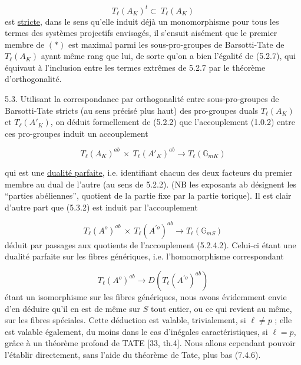 \begin{equation}\tag{*}
T_\ell(A_K)^t \subset \ T_\ell(A_K)
\end{equation}
est \underline{stricte}, dans le sens qu'elle induit déjà un monomorphisme pour tous les termes des systèmes projectifs envisagés, il s'ensuit aisément que le premier membre de $(*)$ est maximal parmi les sous-pro-groupes de Barsotti-Tate de $T_\ell(A_K)$ ayant même rang que lui, de sorte qu'on a bien l'égalité de (5.2.7), qui équivaut à l'inclusion entre les termes extrêmes de 5.2.7 par le théorème d'orthogonalité.

5.3. Utilisant la correspondance par orthogonalité entre sous-pro-groupes de Barsotti-Tate stricts (au sens précisé plus haut) des pro-groupes duals $T_\ell(A_K)$ et $T_\ell(A'_K)$, on déduit formellement de (5.2.2) que l'accouplement (1.0.2) entre ces pro-groupes induit un accouplement

\begin{equation}\tag{5.3.2}
T_\ell(A_K)^{ab} \ \times \ T_\ell(A'_K)^{ab} \longrightarrow T_\ell(\mathbb{G}_{mK})
\end{equation}


qui est une \underline{dualité parfaite}, i.e. identifiant chacun des deux facteurs du premier membre au dual de l'autre (au sens de 5.2.2). (NB les exposants ab désignent les ``parties abéliennes'', quotient de la partie fixe par la partie torique). Il est clair d'autre part que (5.3.2) est induit par l'accouplement

\begin{equation}\tag{5.3.3}
T_\ell(A^o)^{ab} \ \times \ T_\ell(A^{\prime o})^{ab} \longrightarrow T_\ell(\mathbb{G}_{mS})
\end{equation}
déduit par passages aux quotients de l'accouplement (5.2.4.2). Celui-ci étant une dualité parfaite sur les fibres génériques, i.e. l'homomorphisme correspondant

\begin{equation}\tag{5.3.4}
T_\ell(A^o)^{ab} \longrightarrow D(T_\ell(A^{\prime o})^{ab})
\end{equation}
étant un isomorphisme sur les fibres génériques, nous avons évidemment envie d'en déduire qu'il en est de même sur $S$ tout entier, ou ce qui revient au même, sur les fibres spéciales. Cette déduction est valable, trivialement, si $\ell \neq p$ ; elle est valable également, du moins dans le cas d'inégales caractéristiques, si $\ell = p$, grâce à un théorème profond de TATE [33, th.4]. Nous allons cependant pouvoir l'établir directement, sans l'aide du théorème de Tate, plus bas (7.4.6).

